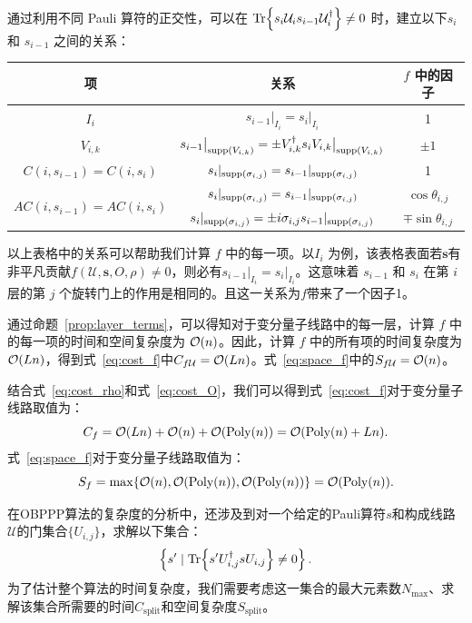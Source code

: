 \begin{remark}\label{remark:f_ele}
通过利用不同 Pauli 算符的正交性，可以在 $\Tr{s_i\mathcal{U}_i s_{i-1}\mathcal{U}_i^\dagger} \neq 0$ 时，建立以下$s_i$ 和 $s_{i-1}$ 之间的关系：

\begin{tabular}{|c|c|c|}
  \hline
   项 & 关系 & $f$ 中的因子\\
  \hline
  ${I_i}$ &$s_{i-1}\big|_{I_i} = s_{i}\big|_{I_i}$& 1 \\
  \hline
  $V_{i,k}$ &$s_{i-1}\big|_{\text{supp} \left( V_{i,k} \right)}= \pm V_{i,k}^{\dagger} s_{i}V_{i,k}\big|_{\text{supp} \left( V_{i,k} \right)}$& $\pm 1$ \\
  \hline
  $C(i,s_{i-1})=C(i,s_{i})$&$s_{i}|_{\text{supp} \left( \sigma_{i,j} \right)}=s_{i-1}|_{\text{supp} \left( \sigma_{i,j} \right)}$& 1 \\
  \hline
  \multirow{2}{*}{$AC(i,s_{i-1})=AC(i,s_{i})$}
  &$s_{i}|_{\text{supp} \left( \sigma_{i,j} \right)}=s_{i-1}|_{\text{supp} \left( \sigma_{i,j} \right)}$& $\cos{\theta_{i,j}}$ \\
  \cline{2-3}
  &$s_{i}|_{\text{supp} \left( \sigma_{i,j} \right)}=\pm i \sigma_{i,j} s_{i-1}|_{\text{supp} \left( \sigma_{i,j} \right)}$& $\mp \sin{\theta_{i,j}}$ \\
  \hline
\end{tabular}

以上表格中的关系可以帮助我们计算 $f$ 中的每一项。以$I_i$ 为例，该表格表面若$\bm{s}$有非平凡贡献$f(\mathcal{U},\bm{s},O,\rho) \neq 0$，则必有$s_{i-1}\big|_{I_i} = s_{i}\big|_{I_i}$。这意味着 $s_{i-1}$ 和 $s_{i}$ 在第 $i$ 层的第 $j$ 个旋转门上的作用是相同的。且这一关系为$f$带来了一个因子1。

通过命题~\ref{prop:layer_terms}，可以得知对于变分量子线路中的每一层，计算 $f$ 中的每一项的时间和空间复杂度为 $\order{n}$。因此，计算 $f$ 中的所有项的时间复杂度为 $\order{L n}$，得到式~\eqref{eq:cost_f}中$C_{f\mathcal{U}}=\order{L n}$。式~\eqref{eq:space_f}中的$S_{f\mathcal{U}}=\order{n}$。
\end{remark}

结合式~\eqref{eq:cost_rho}和式~\eqref{eq:cost_O}，我们可以得到式~\eqref{eq:cost_f}对于变分量子线路取值为：
\begin{equation}\label{eq:vqa:c_f}
    C_f=\order{L n}+\order{n}+\order{\poly(n)}=\order{\poly(n)+L n}.
\end{equation}
式~\eqref{eq:space_f}对于变分量子线路取值为：
\begin{equation}
    S_f=\max\{\order{n},\order{\poly(n)},\order{\poly(n)}\}=\order{\poly(n)}.
\end{equation}


在OBPPP算法的复杂度的分析中，还涉及到对一个给定的Pauli算符$s$和构成线路$\mathcal{U}$的门集合$\{U_{i,j}\}$，求解以下集合：
\begin{equation}
    \left\{ s'\mid \Tr{s' U^\dagger_{i,j}s U_{i,j}}\neq 0 \right\}.
\end{equation}
为了估计整个算法的时间复杂度，我们需要考虑这一集合的最大元素数$N_{\text{max}}$、求解该集合所需要的时间$C_{\text{split}}$和空间复杂度$S_{\text{split}}$。


